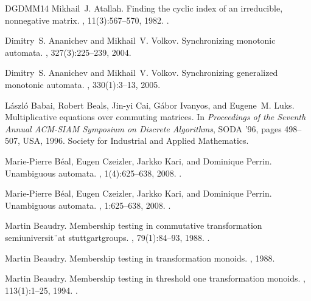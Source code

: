 \documentclass[11pt,a4paper]{amsart}
\theoremstyle{plain}
\theoremstyle{definition}
\theoremstyle{defC}
\theoremstyle{thmC}
\theoremstyle{plain}
\numberwithin{equation}{section}
\begin{document}
\begin{thebibliography}{DGDMM14}
Mikhail~J. Atallah.
\newblock Finding the cyclic index of an irreducible, nonnegative matrix.
, 11(3):567--570, 1982.
\newblock \href {https://doi.org/10.1137/0211047} {}.

Dimitry~S. Ananichev and Mikhail~V. Volkov.
\newblock Synchronizing monotonic automata.
, 327(3):225--239, 2004.

Dimitry~S. Ananichev and Mikhail~V. Volkov.
\newblock Synchronizing generalized monotonic automata.
, 330(1):3--13, 2005.

L\'{a}szl\'{o} Babai, Robert Beals, Jin-yi Cai, G\'{a}bor Ivanyos, and
  Eugene~M. Luks.
\newblock Multiplicative equations over commuting matrices.
\newblock In {\em Proceedings of the Seventh Annual ACM-SIAM Symposium on
  Discrete Algorithms}, SODA '96, pages 498--507, USA, 1996. Society for
  Industrial and Applied Mathematics.

Marie{-}Pierre B{\'{e}}al, Eugen Czeizler, Jarkko Kari, and Dominique Perrin.
\newblock Unambiguous automata.
, 1(4):625--638, 2008.
\newblock \href {https://doi.org/10.1007/S11786-007-0027-1}
  {}.

Marie{-}Pierre B\'{e}al, Eugen Czeizler, Jarkko Kari, and Dominique Perrin.
\newblock Unambiguous automata.
, 1:625--638, 2008.
\newblock \href {https://doi.org/10.1007/s11786-007-0027-1}
  {}.

Martin Beaudry.
\newblock Membership testing in commutative transformation semiuniversit¨at
  stuttgartgroups.
, 79(1):84--93, 1988.
\newblock \href {https://doi.org/10.1016/0890-5401(88)90018-1}
  {}.

Martin Beaudry.
\newblock Membership testing in transformation monoids.
, 1988.

Martin Beaudry.
\newblock Membership testing in threshold one transformation monoids.
, 113(1):1--25, 1994.
\newblock \href {https://doi.org/10.1006/INCO.1994.1062}
  {}.


\end{thebibliography}
\end{document}
